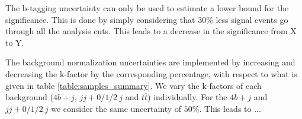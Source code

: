 The b-tagging uncertainty can only be used to estimate a lower bound for the significance. This is done by simply considering that $30\%$ less signal events go through all the analysis cuts. This leads to a decrease in the significance from X to Y.

The background normalization uncertainties are implemented by increasing and decreasing the k-factor by the corresponding percentage, with respect to what is given in table \ref{table:samples_summary}. We vary the k-factors of each background ($4b+j$, $jj+0/1/2~ j$ and $t\overline{t}$) individually. For the $4b+j$ and $jj+0/1/2 ~j$ we consider the same uncertainty of $50\%$. This leads to ...

%
% 
%
%
